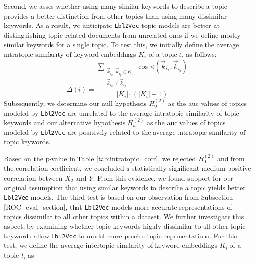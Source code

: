 \documentclass[a4paper,twoside]{article}
\begin{document}
\newline Second, we asses whether using many similar keywords to describe a topic provides a better distinction from other topics than using many dissimilar keywords. As a result, we anticipate \texttt{Lbl2Vec} topic models are better at distinguishing topic-related documents from unrelated ones if we define mostly similar keywords for a single topic. To test this, we initially define the average intratopic similarity of keyword embeddings $K_{i}$ of a topic $t_{i}$ as follows:
\begin{equation}
    \Delta(i)=\frac{\sum\limits_{\substack{\vec{k}_{{i}_x},\vec{k}_{{i}_y} \in K_{i}\\\vec{k}_{{i}_x}\neq\vec{k}_{i_{y}}}}\cos\sphericalangle(\vec{k}_{{i}_x},\vec{k}_{{i}_y})}{|K_{i}|\cdot(|K_{i}|-1)}
\end{equation}
Subsequently, we determine our null hypothesis $H_{0}^{(2)}$ as the \ac{auc} values of topics modeled by \texttt{Lbl2Vec} are unrelated to the average intratopic similarity of topic keywords and our alternative hypothesis $H_{a}^{(2)}$ as the \ac{auc} values of topics modeled by \texttt{Lbl2Vec} are positively related to the average intratopic similarity of topic keywords. 
\begin{table}[ht]
\centering
{}\caption{\label{tab:intratopic_corr} Correlation values that measure the relationship between ${X_2=}$ average intratopic similarity of topic keywords and ${Y=\textrm{\ac{auc}}}$ value of a topic. $X_{2_{min}}=0.15$ and $X_{2_{max}}=0.37$.}
\end{table}
Based on the p-value in Table \ref{tab:intratopic_corr}, we rejected $H_{0}^{(2)}$ and from the correlation coefficient, we concluded a statistically significant medium positive correlation between $X_2$ and $Y$. From this evidence, we found support for our original assumption that using similar keywords to describe a topic yields better \texttt{Lbl2Vec} models. \newline
\newline The third test is based on our observation from Subsection \ref{ROC_eval_section}, that \texttt{Lbl2Vec} models more accurate representations of topics dissimilar to all other topics within a dataset. We further investigate this aspect, by examining whether topic keywords highly dissimilar to all other topic keywords allow \texttt{Lbl2Vec} to model more precise topic representations. For this test, we define the average intertopic similarity of keyword embeddings $K_i$ of a topic $t_i$ as 
\end{document}
